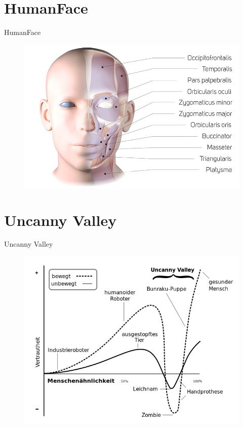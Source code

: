 \documentclass{beamer}
\begin{document}
\section{HumanFace}
\begin{frame}{HumanFace}
	\begin{figure}
		\centering
        \includegraphics[width=\textwidth,height=\textheight,keepaspectratio]{figures/facial_muscles.png}
		\label{fig:facial_muscles}
	\end{figure}
\end{frame}

\section{Uncanny Valley}
\begin{frame}{Uncanny Valley}
	\begin{figure}
		\centering
        \includegraphics[width=\textwidth,height=\textheight-50,keepaspectratio]{figures/uncanny_valley.png}
		\label{fig:uncanny_valley}
	\end{figure}
\end{frame}
\end{document}
